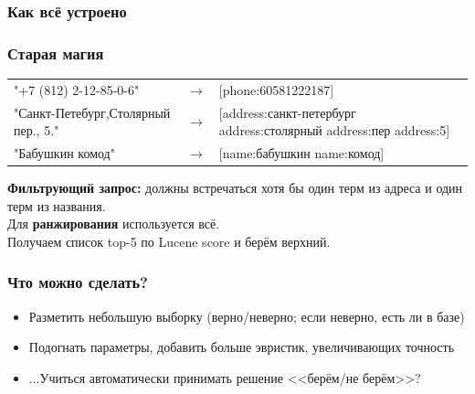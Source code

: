 \documentclass{beamer}
\begin{document}
\begin{frame}\frametitle{Как всё устроено}
\begin{figure}[ht]
\begin{center}
\end{center}
\end{figure}
\end{frame}

\begin{frame}\frametitle{Старая магия}
{\small
	\begin{tabularx}{\textwidth}{XlX}
	  "+7 (812) 2-12-85-0-6" & $\rightarrow$  & [phone:60581222187] \newline \\
	  "Санкт-Петебург,\newline Столярный пер., 5." & $\rightarrow$ & [address:санкт-петербург \newline address:столярный \newline address:пер address:5] \newline \\
	  "Бабушкин комод" & $\rightarrow$  & [name:бабушкин name:комод] \\
	\end{tabularx}
}
\textbf{Фильтрующий запрос:} должны встречаться хотя бы один терм из адреса и один терм из названия.\\
Для \textbf{ранжирования} используется всё.\\
Получаем список top-5 по Lucene score и берём верхний.
\end{frame}

\begin{frame}\frametitle{Что можно сделать?}
	\begin{itemize}
                \item Разметить небольшую выборку (верно/неверно; если неверно, есть ли в базе)
		\item Подогнать параметры, добавить больше эвристик, увеличивающих точность
		\item ...Учиться автоматически принимать решение <<берём/не берём>>?
	\end{itemize}
\end{frame}
\end{document}
